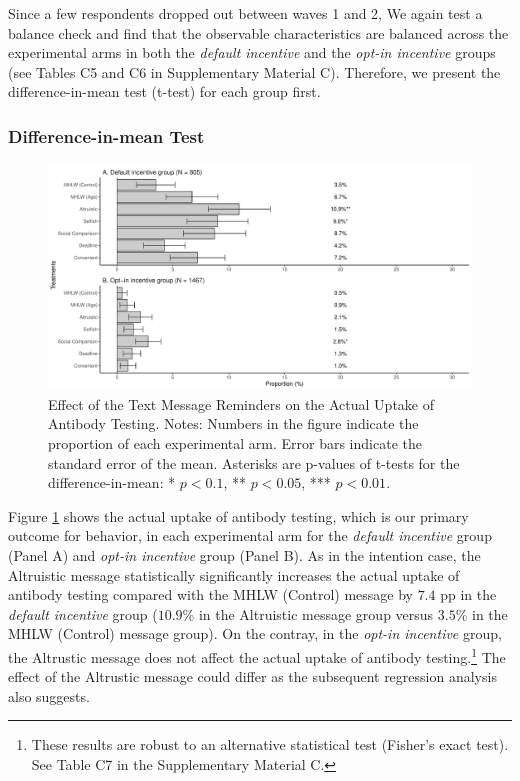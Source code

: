\documentclass[
      12pt,
    a4paper
]{article}
\begin{document}
Since a few respondents dropped out between waves 1 and 2, We again test a balance check and find that the observable characteristics are balanced across the experimental arms in both the \emph{default incentive} and the \emph{opt-in incentive} groups (see Tables C5 and C6 in Supplementary Material C). Therefore, we present the difference-in-mean test (t-test) for each group first.

\hypertarget{difference-in-mean-test-1}{%
\subsubsection{Difference-in-mean Test}\label{difference-in-mean-test-1}}

\begin{figure}[t]
\includegraphics{Main-Document-LaTeX_files/figure-latex/ttest-act-test-1} \caption{Effect of the Text Message Reminders on the Actual Uptake of Antibody Testing. Notes: Numbers in the figure indicate the proportion of each experimental arm. Error bars indicate the standard error of the mean. Asterisks are p-values of t-tests for the difference-in-mean: * $p < 0.1$, ** $p < 0.05$, *** $p < 0.01$.}\label{fig:ttest-act-test}
\end{figure}

Figure \ref{fig:ttest-act-test} shows the actual uptake of antibody testing, which is our primary outcome for behavior, in each experimental arm for the \emph{default incentive} group (Panel A) and \emph{opt-in incentive} group (Panel B). As in the intention case, the Altruistic message statistically significantly increases the actual uptake of antibody testing compared with the MHLW (Control) message by \(7.4\) pp in the \emph{default incentive} group (\(10.9\)\% in the Altruistic message group versus \(3.5\)\% in the MHLW (Control) message group). On the contray, in the \emph{opt-in incentive} group, the Altrustic message does not affect the actual uptake of antibody testing.\footnote{These results are robust to an alternative statistical test (Fisher's exact test). See Table C7 in the Supplementary Material C.} The effect of the Altrustic message could differ as the subsequent regression analysis also suggests.
\end{document}
